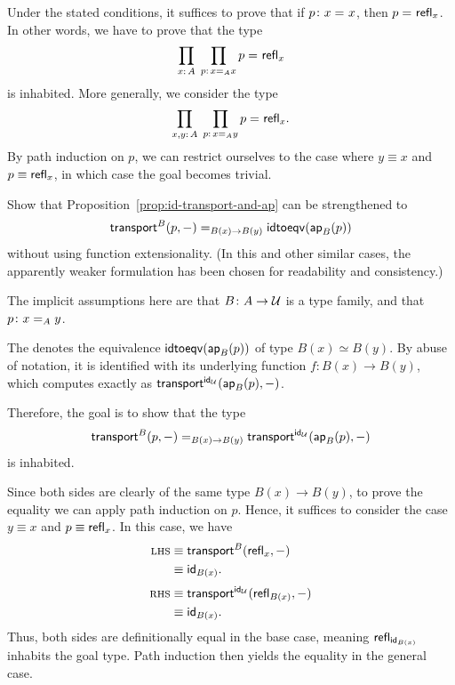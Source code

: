 \begin{solution}
    Under the stated conditions, it suffices to prove that if $p\colon x\eq{}x$, then $p\mathrel{=_{}}\mathsf{refl}_x$. In other words, we have to prove that the type
    \[
        \prod_{x\colon A}\;\prod_{p\colon x\eq{A}x}p\eq{}\fun{refl}_x
    \]
    is inhabited. More generally, we consider the type
    \[
        \prod_{x,y\colon A}\;\prod_{p\colon x\eq{A}y}p\eq{}\fun{refl}_x.
    \]
    By path induction on $p$, we can restrict ourselves to the case where $y\equiv x$ and $p\equiv\mathsf{refl}_x$, in which case the goal becomes trivial.
    
\end{solution}

\begin{exr}
    Show that\/ {\upshape Proposition~\ref{prop:id-transport-and-ap}} can be strengthened to
    \[
        \mathsf{transport}^B(p,{\mathord-})\mathrel{=_{B(x)\to B(y)}}\mathsf{idtoeqv}(\mathsf{ap}_B(p))
    \]
    without using function extensionality. (In this and other similar cases, the apparently weaker formulation has been chosen for readability and consistency.)
\end{exr}

\begin{solution}
    The implicit assumptions here are that $B\colon A\to\univ$ is a type family, and that $p\colon x\eq{A}y$.

    The \rhs denotes the equivalence $\mathsf{idtoeqv}(\mathsf{ap}_B(p))$ of type $B(x)\simeq B(y)$. By abuse of notation, it is identified with its underlying function $f\colon B(x)\to B(y)$, which computes exactly as $\mathsf{transport}^{\mathsf{id}_\mathcal U}(\mathsf{ap}_B(p),{\mathord-})$.

    Therefore, the goal is to show that the type
    \[
        \mathsf{transport}^B(p,{\mathord-})
        \mathrel{=_{B(x)\to B(y)}}
        \mathsf{transport}^{\mathsf{id}_\mathcal U}(\mathsf{ap}_B(p),{\mathord-})
    \]
    is inhabited.

    Since both sides are clearly of the same type $B(x)\to B(y)$, to prove the equality we can apply path induction on $p$. Hence, it suffices to consider the case $y\equiv x$ and $p\equiv\mathsf{refl}_x$. In this case, we have
    \begin{align*}
        \textsc{lhs}
            &\equiv\mathsf{transport}^B(\mathsf{refl}_x,{\mathord-})\\
            &\equiv\mathsf{id}_{B(x)}.\\[1mm]
        \textsc{rhs}
            &\equiv\mathsf{transport}^{\mathsf{id}_\mathcal U}(\mathsf{refl}_{B(x)},{\mathord-})\\
            &\equiv\mathsf{id}_{B(x)}.
    \end{align*}
    Thus, both sides are definitionally equal in the base case, meaning $\mathsf{refl}_{\mathsf{id}_{B(x)}}$ inhabits the goal type. Path induction then yields the equality in the general case.
    
\end{solution}


